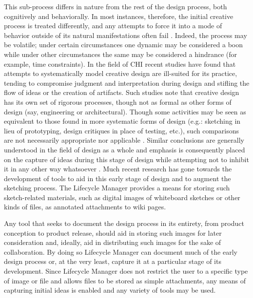 \documentclass[letterpaper,10pt]{article}
\begin{document}
                This sub-process differs in nature from the rest of the 
                design process, both cognitively and behaviorally.  In most 
                instances, therefore, the initial creative process is treated 
                differently, and any attempts to force it into a mode of behavior 
                outside of its natural manifestations often fail \cite{goel}.  
                Indeed, the process may be volatile; under certain 
                circumstances one dynamic may be considered a boon while 
                under other circumstances the same may be considered a 
                hindrance (for example, time constraints).  In the field of 
                CHI recent studies have found that attempts to systematically 
                model creative design are ill-suited for its practice, 
                tending to compromise judgment and interpretation during 
                design and stifling the flow of ideas or the creation of 
                artifacts.  Such studies note that creative design has its 
                own set of rigorous processes, though not as formal as other 
                forms of design (say, engineering or architectural).  Though 
                some activities may be seen as equivalent to those found in 
                more systematic forms of design (e.g.: sketching in lieu of 
                prototyping, design critiques in  place of testing, etc.), 
                such comparisons are not necessarily appropriate nor 
                applicable \cite{goel,vetting_wolf_rode}.  Similar 
                conclusions are generally understood in the field of design 
                as a whole and emphasis is consequently placed on the capture 
                of ideas during this stage of design while attempting not to 
                inhibit it in any other way whatsoever 
                \cite{grundy_hosking,plimmer_apperley,oh_Stuerzlinger_danahy,
                martin,kara_eramo_shimada}.  Much recent research has gone 
                towards the development of tools to aid in this early stage 
                of design and to augment the sketching process.  The 
                Lifecycle Manager provides a means for storing such 
                sketch-related materials, such as digital images of 
                whiteboard sketches or other kinds of files, as annotated 
                attachments to wiki pages.

                Any tool that seeks to document the design process in its 
                entirety, from product conception to product release, should 
                aid in storing such images for later consideration and, 
                ideally, aid in distributing such images for the sake of 
                collaboration.  By doing so Lifecycle Manager can document 
                much of the early design process or, at the very least, 
                capture it at a particular stage of its development.  Since 
                Lifecycle Manager does not restrict the user to a specific 
                type of image or file and allows files to be stored as simple 
                attachments, any means of capturing initial ideas is enabled 
                and any variety of tools may be used.
\end{document}
